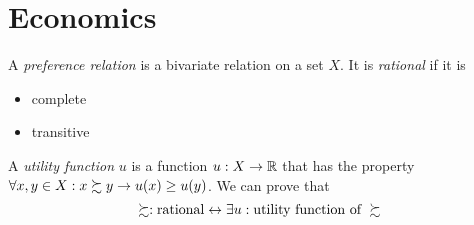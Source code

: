 \section{Economics}

A \emph{preference relation} \preferred is a bivariate relation on a set $X$. It is \emph{rational} if it is 
\begin{itemize}
    \item complete
    \item transitive
\end{itemize}

A \emph{utility function} $u$ is a function $u: X \to \mathbb{R}$ that has the property $\forall x, y \in X: x \succsim y \to u(x) \geq u(y)$. We can prove that 
$$\succsim : \text{rational} \leftrightarrow \exists u:\text{utility function of }\succsim $$

